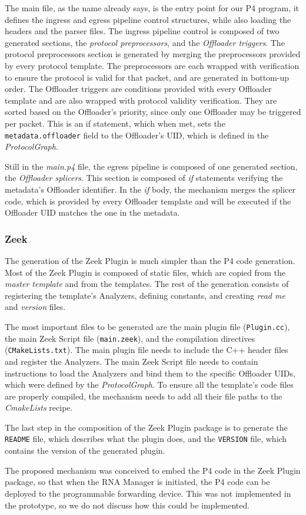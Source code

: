 The main file, as the name already says, is the entry point for our P4 program, it defines the ingress and egress pipeline control structures, while also loading the headers and the parser files. The ingress pipeline control is composed of two generated sections, the \textit{protocol preprocessors}, and the \textit{Offloader triggers}. The protocol preprocessors section is generated by merging the preprocessors provided by every protocol template. The preprocessors are each wrapped with verification to ensure the protocol is valid for that packet, and are generated in bottom-up order. The Offloader triggers are conditions provided with every Offloader template and are also wrapped with protocol validity verification. They are sorted based on the Offloader's priority, since only one Offloader may be triggered per packet. This is an if statement, which when met, sets the \texttt{metadata.offloader} field to the Offloader's UID, which is defined in the \textit{ProtocolGraph}.

Still in the \textit{main.p4} file, the egress pipeline is composed of one generated section, the \textit{Offloader splicers}. This section is composed of \textit{if} statements verifying the metadata's Offloader identifier. In the \textit{if} body, the mechanism merges the splicer code, which is provided by every Offloader template and will be executed if the Offloader UID matches the one in the metadata.

\subsubsection*{Zeek}

The generation of the Zeek Plugin is much simpler than the P4 code generation. Most of the Zeek Plugin is composed of static files, which are copied from the \textit{master template} and from the templates. The rest of the generation consists of registering the template's Analyzers, defining constants, and creating \textit{read me} and \textit{version} files.

The most important files to be generated are the main plugin file (\texttt{Plugin.cc}), the main Zeek Script file (\texttt{main.zeek}), and the compilation directives (\texttt{CMakeLists.txt}). The main plugin file needs to include the C++ header files and register the Analyzers. The main Zeek Script file needs to contain instructions to load the Analyzers and bind them to the specific Offloader UIDs, which were defined by the \textit{ProtocolGraph}. To ensure all the template's code files are properly compiled, the mechanism needs to add all their file paths to the \textit{CmakeLists} recipe.

The last step in the composition of the Zeek Plugin package is to generate the \texttt{README} file, which describes what the plugin does, and the \texttt{VERSION} file, which contains the version of the generated plugin.

The proposed mechanism was conceived to embed the P4 code in the Zeek Plugin package, so that when the RNA Manager is initiated, the P4 code can be deployed to the programmable forwarding device. This was not implemented in the prototype, so we do not discuss how this could be implemented.

% 
% 
